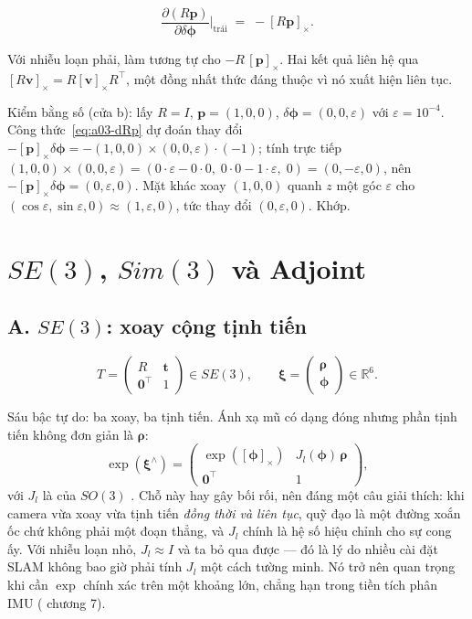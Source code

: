 \documentclass[../../vslam.tex]{subfiles}
\begin{document}
\begin{equation}
\frac{\partial (R\mathbf{p})}{\partial \delta\boldsymbol{\phi}}\bigg|_{\text{trái}} \;=\; -[R\mathbf{p}]_\times .
\label{eq:a03-dRp}
\end{equation}

Với nhiễu loạn phải, làm tương tự cho \(-R\,[\mathbf{p}]_\times\). Hai kết quả liên hệ qua \([R\mathbf{v}]_\times = R[\mathbf{v}]_\times R^{\top}\), một đồng nhất thức đáng thuộc vì nó xuất hiện liên tục.

Kiểm bằng số (cửa b): lấy \(R = I\), \(\mathbf{p} = (1,0,0)\), \(\delta\boldsymbol{\phi} = (0,0,\varepsilon)\) với \(\varepsilon = 10^{-4}\). Công thức~\eqref{eq:a03-dRp} dự đoán thay đổi \(-[\mathbf{p}]_\times\delta\boldsymbol{\phi} = -(1,0,0)\times(0,0,\varepsilon)\cdot(-1)\); tính trực tiếp \((1,0,0)\times(0,0,\varepsilon) = (0\cdot\varepsilon - 0\cdot 0,\; 0\cdot 0 - 1\cdot\varepsilon,\; 0) = (0,-\varepsilon,0)\), nên \(-[\mathbf{p}]_\times\delta\boldsymbol{\phi} = (0,\varepsilon,0)\). Mặt khác xoay \((1,0,0)\) quanh \(z\) một góc \(\varepsilon\) cho \((\cos\varepsilon, \sin\varepsilon, 0) \approx (1, \varepsilon, 0)\), tức thay đổi \((0,\varepsilon,0)\). Khớp.

\section{\(SE(3)\), \(Sim(3)\) và Adjoint}

\subsection{A. \(SE(3)\): xoay cộng tịnh tiến}

\[
T = \begin{pmatrix} R & \mathbf{t} \\ \mathbf{0}^{\top} & 1\end{pmatrix} \in SE(3),
\qquad
\boldsymbol{\xi} = \begin{pmatrix}\boldsymbol{\rho} \\ \boldsymbol{\phi}\end{pmatrix} \in \mathbb{R}^6 .
\]

Sáu bậc tự do: ba xoay, ba tịnh tiến. Ánh xạ mũ có dạng đóng nhưng phần tịnh tiến không đơn giản là \(\boldsymbol{\rho}\):
\[
\exp(\boldsymbol{\xi}^\wedge) = \begin{pmatrix} \exp([\boldsymbol{\phi}]_\times) & J_l(\boldsymbol{\phi})\,\boldsymbol{\rho} \\ \mathbf{0}^{\top} & 1\end{pmatrix},
\]
với \(J_l\) là  của \(SO(3)\) \cite[§7.1.5]{barfoot2017}. Chỗ này hay gây bối rối, nên đáng một câu giải thích: khi camera vừa xoay vừa tịnh tiến \emph{đồng thời và liên tục}, quỹ đạo là một đường xoắn ốc chứ không phải một đoạn thẳng, và \(J_l\) chính là hệ số hiệu chỉnh cho sự cong ấy. Với nhiễu loạn nhỏ, \(J_l \approx I\) và ta bỏ qua được --- đó là lý do nhiều cài đặt SLAM không bao giờ phải tính \(J_l\) một cách tường minh. Nó trở nên quan trọng khi cần \(\exp\) chính xác trên một khoảng lớn, chẳng hạn trong tiền tích phân IMU ( chương 7).
\end{document}
